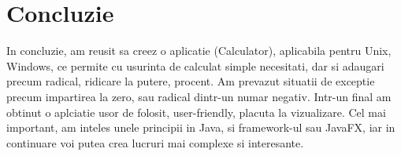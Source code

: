 \section*{Concluzie}


In concluzie, am reusit sa creez o aplicatie (Calculator), aplicabila pentru Unix, Windows, ce permite cu usurinta de calculat simple necesitati, dar si adaugari precum radical, ridicare la putere, procent. Am prevazut situatii de exceptie precum impartirea la zero, sau radical dintr-un numar negativ. Intr-un final am obtinut o aplciatie usor de folosit, user-friendly, placuta la vizualizare. Cel mai important, am inteles unele principii in Java, si framework-ul sau JavaFX, iar in continuare voi putea crea lucruri mai complexe si interesante.

\clearpage